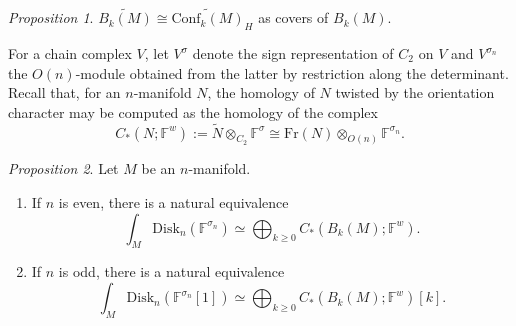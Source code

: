 \documentclass{compositio}
\theoremstyle{definition}\newtheorem{definition}{Definition}[section]
\theoremstyle{theorem}\newtheorem{lemma}[definition]{Lemma}
\theoremstyle{remark}\newtheorem*{conventions}{Conventions}
\theoremstyle{remark}\newtheorem*{acknowledgments}{Acknowledgments}
\theoremstyle{remark}\newtheorem*{outline}{Outline}
\theoremstyle{remark}\newtheorem*{questions}{Questions}
\theoremstyle{remark}\newtheorem{example}[definition]{Example}
\theoremstyle{definition}\newtheorem{construction}[definition]{Construction}
\theoremstyle{definition}\newtheorem*{convention}{Convention}
\theoremstyle{definition}\newtheorem*{conjecture}{Conjecture}
\theoremstyle{theorem}\newtheorem{theorem}[definition]{Theorem}
\theoremstyle{theorem}\newtheorem{paradigm}[definition]{Paradigm}
\theoremstyle{remark}\newtheorem{remark}[definition]{Remark}
\theoremstyle{corollary}\newtheorem{corollary}[definition]{Corollary}
\theoremstyle{theorem}\newtheorem{proposition}[definition]{Proposition}
\theoremstyle{definition}\newtheorem{question}[definition]{Question}
\begin{document}
\begin{proposition} $\widetilde{B_k(M)}\cong \widetilde{{\mathrm{Conf}}_k(M)}_H$ as covers of $B_k(M)$.
\end{proposition}

For a chain complex $V$, let $V^\sigma$ denote the sign representation of $C_2$ on $V$ and $V^{\sigma_n}$ the $O(n)$-module obtained from the latter by restriction along the determinant. Recall that, for an $n$-manifold $N$, the homology of $N$ twisted by the orientation character may be computed as the homology of the complex $$C_*(N;\mathbb{F}^w):=\widetilde N\otimes_{C_2}\mathbb{F}^\sigma\cong {\mathrm{Fr}}(N)\otimes_{O(n)}\mathbb{F}^{\sigma_n}.$$

\begin{proposition}\label{twisted homology} Let $M$ be an $n$-manifold.
\begin{enumerate}
\item If $n$ is even, there is a natural equivalence $$\int_M{\mathrm{Disk}}_n(\mathbb{F}^{\sigma_n})\simeq \bigoplus_{k\geq0}C_*(B_k(M);\mathbb{F}^w).$$
\item If $n$ is odd, there is a natural equivalence $$\int_M{\mathrm{Disk}}_n(\mathbb{F}^{\sigma_n}[1])\simeq\bigoplus_{k\geq0} C_*(B_k(M); \mathbb{F}^w)[k].$$
\end{enumerate}
\end{proposition}
\end{document}
